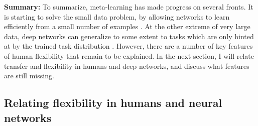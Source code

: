 \documentclass[11pt]{article}
\begin{document}
\textbf{Summary:} To summarize, meta-learning has made progress on several fronts. It is starting to solve the small data problem, by allowing networks to learn efficiently from a small number of examples \citep[e.g.]{Wang2016a}. At the other extreme of very large data, deep networks can generalize to some extent to tasks which are only hinted at by the trained task distribution \citep[e.g.]{Radford2019}. However, there are a number of key features of human flexibility that remain to be explained. In the next section, I will relate transfer and flexibility in humans and deep networks, and discuss what features are still missing. \par 

\subsection{Relating flexibility in humans and neural networks}
\end{document}
